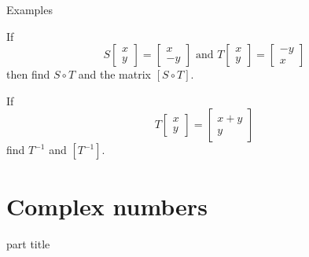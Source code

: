 \documentclass{beamer}
\begin{document}
\begin{frame}{Examples}
\begin{example}
If
\begin{equation*}
S \left[
\begin{array}{c}
x\\
y
\end{array}
\right] = \left[
\begin{array}{c}
x\\
-y
\end{array}
\right]\text{ and } T \left[
\begin{array}{c}
x\\
y
\end{array}
\right] = \left[
\begin{array}{c}
-y\\
x
\end{array}
\right]
\end{equation*}
then find $S\circ T$ and the matrix $[S\circ T]$.
\end{example}

\begin{example}
If
\begin{equation*}
T \left[
\begin{array}{c}
x\\
y
\end{array}
\right] = \left[
\begin{array}{c}
x+y\\
y
\end{array}
\right]
\end{equation*}
find $T^{-1}$ and $[T^{-1}]$.
\end{example}
\end{frame}


\section{Complex numbers}

\begin{frame}
\begin{beamercolorbox}[sep=12pt,center]{part title}
\insertsection\par
\end{beamercolorbox}
\end{frame}
\end{document}
